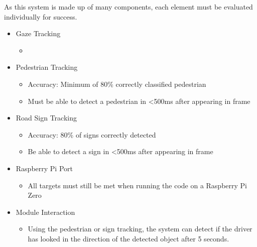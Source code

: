 As this system is made up of many components, each element must be evaluated individually for success.
\begin{itemize}
    \item Gaze Tracking
        \begin{itemize}
            \item 
        \end{itemize}
    \item Pedestrian Tracking
        \begin{itemize}
            \item Accuracy: Minimum of 80\% correctly classified pedestrian
            \item Must be able to detect a pedestrian in <500ms after appearing in frame
        \end{itemize}
    \item Road Sign Tracking
        \begin{itemize}
            \item Accuracy: 80\% of signs correctly detected
            \item Be able to detect a sign in <500ms after appearing in frame
        \end{itemize}
    \item Raspberry Pi Port
        \begin{itemize}
            \item All targets must still be met when running the code on a Raspberry Pi Zero
        \end{itemize}
    \item Module Interaction
        \begin{itemize}
            \item Using the pedestrian or sign tracking, the system can detect if the driver has looked in the direction of the detected object after 5 seconds.
        \end{itemize}
\end{itemize}